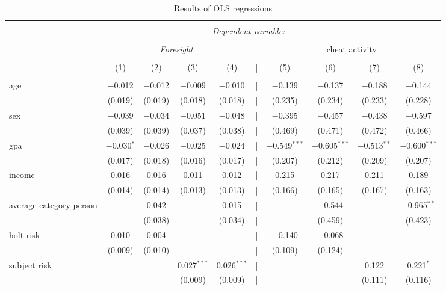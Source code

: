 \documentclass[12pt]{article}
\begin{document}
	\begin{table}[!htbp] \centering 
		  \caption{Results of OLS regressions} 
		  \label{ols} 
		  \scriptsize
		\begin{tabular}{@{\extracolsep{5pt}}lccccccccc} 
		\\[-5ex]\hline 
		\hline \\[-1.8ex] 
		 & \multicolumn{8}{c}{\textit{Dependent variable:}} \\ 
		\cline{2-9} 
		\\[-1.8ex] & \multicolumn{4}{c}{\textit{Foresight}} & & \multicolumn{4}{c}{cheat activity} \\ 
		\\[-1.8ex] & (1) & (2) & (3) & (4) & | & (5) & (6) & (7) & (8)\\ 
		\hline \\[-1.8ex] 
		 age & $-$0.012 & $-$0.012 & $-$0.009 & $-$0.010 & |& $-$0.139 & $-$0.137 & $-$0.188 & $-$0.144 \\ 
		  & (0.019) & (0.019) & (0.018) & (0.018) & |& (0.235) & (0.234) & (0.233) & (0.228) \\ 
		 sex & $-$0.039 & $-$0.034 & $-$0.051 & $-$0.048& | & $-$0.395 & $-$0.457 & $-$0.438 & $-$0.597 \\ 
		  & (0.039) & (0.039) & (0.037) & (0.038) & |& (0.469) & (0.471) & (0.472) & (0.466) \\ 
		 gpa & $-$0.030$^{*}$ & $-$0.026 & $-$0.025 & $-$0.024 & |& $-$0.549$^{***}$ & $-$0.605$^{***}$ & $-$0.513$^{**}$ & $-$0.600$^{***}$ \\ 
		  & (0.017) & (0.018) & (0.016) & (0.017)& | & (0.207) & (0.212) & (0.209) & (0.207) \\ 
		 income & 0.016 & 0.016 & 0.011 & 0.012 & |& 0.215 & 0.217 & 0.211 & 0.189 \\ 
		  & (0.014) & (0.014) & (0.013) & (0.013) & |& (0.166) & (0.165) & (0.167) & (0.163) \\ 
		 average category person &  & 0.042 &  & 0.015 & |&  & $-$0.544 &  & $-$0.965$^{**}$ \\ 
		  &  & (0.038) &  & (0.034) & |&  & (0.459) &  & (0.423) \\ 
		 holt risk & 0.010 & 0.004 &  &  & |& $-$0.140 & $-$0.068 &  &  \\ 
		  & (0.009) & (0.010) &  &  & |& (0.109) & (0.124) &  &  \\ 
		 subject risk &  &  & 0.027$^{***}$ & 0.026$^{***}$ & |&  &  & 0.122 & 0.221$^{*}$ \\ 
		  &  &  & (0.009) & (0.009) & |&  &  & (0.111) & (0.116) \\ 

\end{tabular}
\end{table}
\end{document}
